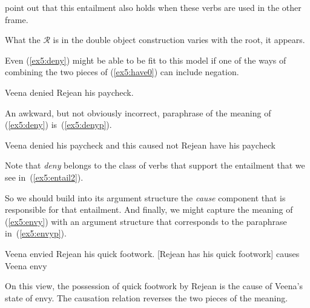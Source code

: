 \citet{Hovav:2008} point out that this entailment also holds when these verbs are used in the other frame.\enlargethispage*{20pt}
\begin{exe}
	\raggedright
	\ex \label{ex5:entail3} 
	\begin{xlist}
	\end{xlist}	
\end{exe}
What the $\mathcal{R}$ is in the double object construction varies with the root, it appears.

Even (\ref{ex5:deny}) might be able to be fit to this model if one of the ways of combining the two pieces of (\ref{ex5:have0}) can include negation.
\begin{exe}
	\raggedright
	Veena denied Rejean his paycheck.
\end{exe}
An awkward, but not obviously incorrect, paraphrase of the meaning of (\ref{ex5:deny}) is~(\ref{ex5:denyp}).
\begin{exe}
	\raggedright
	\ex \label{ex5:denyp} 
	Veena denied his paycheck and this caused not Rejean have his paycheck
\end{exe} 
Note that \emph{deny} belongs to the class of verbs that support the entailment that we see in~(\ref{ex5:entail2}).
\begin{exe}
	\raggedright
\end{exe}
So we should build into its argument structure the \emph{cause} component that is responsible for that entailment. And finally, we might capture the meaning of (\ref{ex5:envy}) with an argument structure that corresponds to the paraphrase in~(\ref{ex5:envyp}).
\begin{exe}
	\raggedright
	 Veena envied Rejean his quick footwork.
	\ex \label{ex5:envyp} {} [Rejean has his quick footwork] causes Veena envy
\end{exe}
On this view, the possession of quick footwork by Rejean is the cause of Veena's state of envy. The causation relation reverses the two pieces of the meaning.

